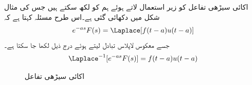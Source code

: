 اکائی سیڑھی تفاعل کو زیر استعمال لاتے ہوئے ہم  کو  لکھ سکتے ہیں جس کی مثال شکل  میں دکھائی گئی ہے۔اس طرح مسئلہ   کہتا ہے کہ
\begin{align}\label{مساوات_لاپلاس_منتقلی_وقت_صورت_الف}
e^{-as}F(s)=\Laplace[f(t-a)u(t-a)]
\end{align}
جسے معکوس لاپلاس تبادل لیتے ہوئے درج ذیل لکھا جا سکتا ہے۔
\begin{align}\label{مساوات_لاپلاس_منتقلی_وقت_صورت_ب}
\Laplace^{-1}[e^{-as}F(s)]=f(t-a)u(t-a)
\end{align}
%
\begin{figure}
\centering
{}
\caption{اکائی سیڑھی تفاعل }
\label{شکل_لاپلاس_اکائی_سیڑھی_تفاعل}
\end{figure}
%
